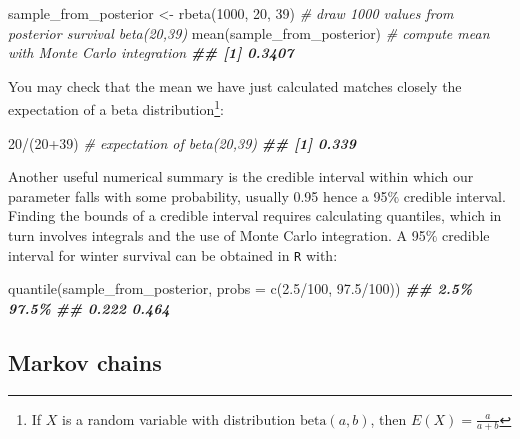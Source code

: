 \documentclass[
  12pt,
]{krantz}
\newenvironment{Shaded}{\begin{snugshade}}{\end{snugshade}}
\newcommand{\AttributeTok}[1]{\textcolor[rgb]{0.77,0.63,0.00}{#1}}
\newcommand{\CommentTok}[1]{\textcolor[rgb]{0.56,0.35,0.01}{\textit{#1}}}
\newcommand{\DecValTok}[1]{\textcolor[rgb]{0.00,0.00,0.81}{#1}}
\newcommand{\DocumentationTok}[1]{\textcolor[rgb]{0.56,0.35,0.01}{\textbf{\textit{#1}}}}
\newcommand{\FloatTok}[1]{\textcolor[rgb]{0.00,0.00,0.81}{#1}}
\newcommand{\FunctionTok}[1]{\textcolor[rgb]{0.00,0.00,0.00}{#1}}
\newcommand{\NormalTok}[1]{#1}
\newcommand{\OtherTok}[1]{\textcolor[rgb]{0.56,0.35,0.01}{#1}}
\newcommand{\SpecialCharTok}[1]{\textcolor[rgb]{0.00,0.00,0.00}{#1}}
\begin{document}
\begin{Shaded}
\begin{Highlighting}[]
\NormalTok{sample\_from\_posterior }\OtherTok{\textless{}{-}} \FunctionTok{rbeta}\NormalTok{(}\DecValTok{1000}\NormalTok{, }\DecValTok{20}\NormalTok{, }\DecValTok{39}\NormalTok{) }\CommentTok{\# draw 1000 values from posterior survival beta(20,39)}
\FunctionTok{mean}\NormalTok{(sample\_from\_posterior) }\CommentTok{\# compute mean with Monte Carlo integration}
\DocumentationTok{\#\# [1] 0.3407}
\end{Highlighting}
\end{Shaded}

You may check that the mean we have just calculated matches closely the expectation of a beta distribution\footnote{If \(X\) is a random variable with distribution \(\text{beta}(a, b)\), then \(E(X) = \displaystyle{\frac{a}{a + b}}\)}:

\begin{Shaded}
\begin{Highlighting}[]
\DecValTok{20}\SpecialCharTok{/}\NormalTok{(}\DecValTok{20}\SpecialCharTok{+}\DecValTok{39}\NormalTok{) }\CommentTok{\# expectation of beta(20,39)}
\DocumentationTok{\#\# [1] 0.339}
\end{Highlighting}
\end{Shaded}

Another useful numerical summary is the credible interval within which our parameter falls with some probability, usually 0.95 hence a 95\(\%\) credible interval. Finding the bounds of a credible interval requires calculating quantiles, which in turn involves integrals and the use of Monte Carlo integration. A 95\(\%\) credible interval for winter survival can be obtained in \texttt{R} with:

\begin{Shaded}
\begin{Highlighting}[]
\FunctionTok{quantile}\NormalTok{(sample\_from\_posterior, }\AttributeTok{probs =} \FunctionTok{c}\NormalTok{(}\FloatTok{2.5}\SpecialCharTok{/}\DecValTok{100}\NormalTok{, }\FloatTok{97.5}\SpecialCharTok{/}\DecValTok{100}\NormalTok{))}
\DocumentationTok{\#\#  2.5\% 97.5\% }
\DocumentationTok{\#\# 0.222 0.464}
\end{Highlighting}
\end{Shaded}

\hypertarget{markovmodelmcmc}{%
\subsection{Markov chains}\label{markovmodelmcmc}}
\end{document}
